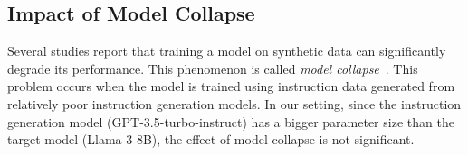 \subsection{Impact of Model Collapse}
Several studies report that training a model on synthetic data can
significantly degrade its performance. This phenomenon is called 
\textit{model collapse}~\cite{modelcollapse1, modelcollapse2, modelcollapse3}.
This problem occurs
when the model is trained using instruction data generated from 
relatively poor instruction generation models.
In our setting, since the instruction generation model (GPT-3.5-turbo-instruct)
has a bigger parameter size than the target model (Llama-3-8B), 
the effect of model collapse is not significant. 
\begin{comment}
\begin{table}[t]
\scriptsize
\centering
\caption{Investigation of the effect of model collapse}%
\label{tab:collapse}
\begin{tabular}{c|cc}
\multicolumn{1}{l|}{\textbf{}} &
  \begin{tabular}[c]{@{}c@{}}Llama-3-8B +\\ \ours{} (ours)\end{tabular} &
  \begin{tabular}[c]{@{}c@{}}Llama-3-8B +\\ Self-Instruct\end{tabular} \\ \thickhline
  \begin{tabular}[c]{@{}c@{}}\textbf{AlpacaEval}\\(Win \% vs GPT-4)\end{tabular} & 5.2 (5.4)   & 3.3 (4.6)   \\ \hline
  \begin{tabular}[c]{@{}c@{}}\textbf{MMLU}\\(Accuracy \%)\end{tabular}           & 53.2 (56.6) & 50.9 (56.5) \\ \hline
  \begin{tabular}[c]{@{}c@{}}\textbf{Hellaswag}\\(Accuracy \%)\end{tabular}      & 55.7 (56.1) & 53.0 (55.7) \\ \hline
  \begin{tabular}[c]{@{}c@{}}\textbf{ARC}\\(Accuracy \%)\end{tabular}            & 67.4 (69.3) & 65.8 (67.7)
\end{tabular}%
\end{table}
\end{comment}

